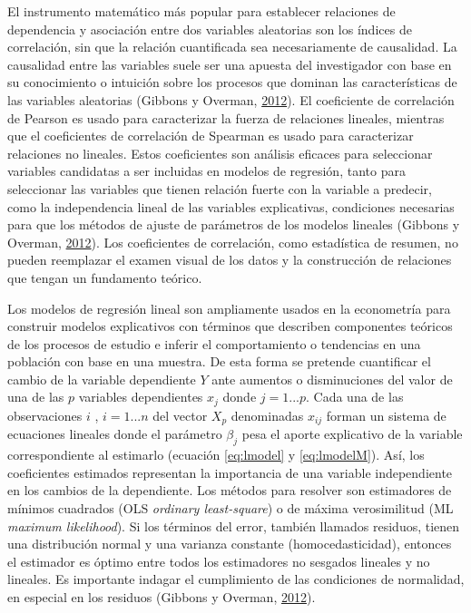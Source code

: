 \documentclass[12pt,a4paper,openany]{book}
\theoremstyle{definition}
\theoremstyle{definition}
\theoremstyle{definition}
\theoremstyle{remark}
\begin{document}
El instrumento matemático más popular para establecer relaciones de
dependencia y asociación entre dos variables aleatorias son los índices
de correlación, sin que la relación cuantificada sea necesariamente de
causalidad. La causalidad entre las variables suele ser una apuesta del
investigador con base en su conocimiento o intuición sobre los procesos
que dominan las características de las variables aleatorias (Gibbons y
Overman, \protect\hyperlink{ref-gibbons_mostly_2012}{2012}). El
coeficiente de correlación de Pearson es usado para caracterizar la
fuerza de relaciones lineales, mientras que el coeficientes de
correlación de Spearman es usado para caracterizar relaciones no
lineales. Estos coeficientes son análisis eficaces para seleccionar
variables candidatas a ser incluidas en modelos de regresión, tanto para
seleccionar las variables que tienen relación fuerte con la variable a
predecir, como la independencia lineal de las variables explicativas,
condiciones necesarias para que los métodos de ajuste de parámetros de
los modelos lineales (Gibbons y Overman,
\protect\hyperlink{ref-gibbons_mostly_2012}{2012}). Los coeficientes de
correlación, como estadística de resumen, no pueden reemplazar el examen
visual de los datos y la construcción de relaciones que tengan un
fundamento teórico.

Los modelos de regresión lineal son ampliamente usados en la econometría
para construir modelos explicativos con términos que describen
componentes teóricos de los procesos de estudio e inferir el
comportamiento o tendencias en una población con base en una muestra. De
esta forma se pretende cuantificar el cambio de la variable dependiente
\(Y\) ante aumentos o disminuciones del valor de una de las \(p\)
variables dependientes \(x_j\) donde \(j =1...p\). Cada una de las
observaciones \(i\) , \(i=1...n\) del vector \(X_p\) denominadas
\(x_{ij}\) forman un sistema de ecuaciones lineales donde el parámetro
\(\beta_j\) pesa el aporte explicativo de la variable correspondiente al
estimarlo (ecuación \eqref{eq:lmodel} y \eqref{eq:lmodelM}). Así, los
coeficientes estimados representan la importancia de una variable
independiente en los cambios de la dependiente. Los métodos para
resolver son estimadores de mínimos cuadrados (OLS \emph{ordinary
least-square}) o de máxima verosimilitud (ML \emph{maximum likelihood}).
Si los términos del error, también llamados residuos, tienen una
distribución normal y una varianza constante (homocedasticidad),
entonces el estimador es óptimo entre todos los estimadores no sesgados
lineales y no lineales. Es importante indagar el cumplimiento de las
condiciones de normalidad, en especial en los residuos (Gibbons y
Overman, \protect\hyperlink{ref-gibbons_mostly_2012}{2012}).
\end{document}
